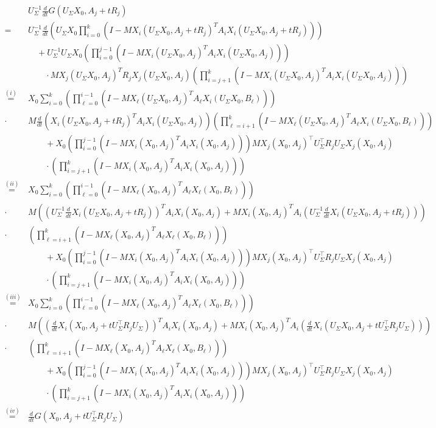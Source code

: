 \documentclass{article}
\newcommand*\lrp[1]{\left( #1 \right)}
\newcommand{\US}{U_\Sigma}
\begin{document}
\iffalse
{\allowdisplaybreaks
\begin{align*}
& \US^{-1} \frac{d}{dt} G(\US X_0, A_j + t R_j)\\
=& \US^{-1} \frac{d}{dt} \lrp{\US X_0 \prod_{i=0}^{k} \lrp{I - M X_i(\US X_0,A_j+tR_j)^T A_i X_i(\US X_0,A_j+tR_j)}}\\
&\quad + \US^{-1} \US X_0 \lrp{ \prod_{i=0}^{j-1} \lrp{I - M X_i(\US X_0,A_j)^T A_i X_i(\US X_0,A_j)}} \\
&\qquad \cdot M X_j(\US X_0,A_j)^T R_j X_j(\US X_0,A_j) \lrp{ \prod_{i=j+1}^{k} \lrp{I - M X_i(\US X_0,A_j)^T A_i X_i(\US X_0,A_j)}}\\
\overset{(i)}{=}& X_0 \sum_{i=0}^k \lrp{\prod_{\ell=0}^{i-1} \lrp{I - M X_\ell(\US X_0,A_j)^T A_\ell X_i(\US X_0,B_\ell)}}\\
\cdot& M \frac{d}{dt} \lrp{X_i(\US X_0,A_j+tR_j)^T A_i X_i(\US X_0,A_j)} \lrp{\prod_{\ell=i+1}^{k} \lrp{I - M X_\ell(\US X_0,A_j)^T A_\ell X_i(\US X_0,B_\ell)}}\\
&\qquad + X_0 \lrp{ \prod_{i=0}^{j-1} \lrp{I - M X_i(X_0,A_j)^T A_i X_i(X_0,A_j)}} M X_j(X_0,A_j)^\top \US^\top R_j \US X_j(X_0,A_j)\\
&\qquad \cdot \lrp{ \prod_{i=j+1}^{k} \lrp{I - M X_i(X_0,A_j)^T A_i X_i(X_0,A_j)}}\\
\overset{(ii)}{=}& X_0 \sum_{i=0}^k \lrp{\prod_{\ell=0}^{i-1} \lrp{I - M X_\ell(X_0,A_j)^T A_\ell X_\ell(X_0,B_\ell)}}\\
\cdot& M \lrp{\lrp{\US^{-1} \frac{d}{dt}X_i(\US X_0,A_j+tR_j)}^T A_i X_i(X_0,A_j) + M {X_i(X_0,A_j)}^T A_i \lrp{\US^{-1} \frac{d}{dt}X_i(\US X_0,A_j+tR_j)}}\\
\cdot& \lrp{\prod_{\ell=i+1}^{k} \lrp{I - M X_\ell( X_0,A_j)^T A_\ell X_\ell( X_0,B_\ell)}}\\
&\qquad + X_0 \lrp{ \prod_{i=0}^{j-1} \lrp{I - M X_i(X_0,A_j)^T A_i X_i(X_0,A_j)}} M X_j(X_0,A_j)^\top \US^\top R_j \US X_j(X_0,A_j)\\
&\qquad \cdot \lrp{ \prod_{i=j+1}^{k} \lrp{I - M X_i(X_0,A_j)^T A_i X_i(X_0,A_j)}}\\
\overset{(iii)}{=}& X_0 \sum_{i=0}^k \lrp{\prod_{\ell=0}^{i-1} \lrp{I - M X_\ell(X_0,A_j)^T A_\ell X_\ell(X_0,B_\ell)}}\\
\cdot& M \lrp{\lrp{\frac{d}{dt}X_i( X_0,A_j+t \US^{\top} R_j \US)}^T A_i X_i(X_0,A_j) + M {X_i(X_0,A_j)}^T A_i \lrp{\frac{d}{dt}X_i(\US X_0,A_j+t\US^{\top} R_j \US)}}\\
\cdot& \lrp{\prod_{\ell=i+1}^{k} \lrp{I - M X_\ell( X_0,A_j)^T A_\ell X_\ell( X_0,B_\ell)}}\\
&\qquad + X_0 \lrp{ \prod_{i=0}^{j-1} \lrp{I - M X_i(X_0,A_j)^T A_i X_i(X_0,A_j)}} M X_j(X_0,A_j)^\top \US^\top R_j \US X_j(X_0,A_j)\\
&\qquad \cdot \lrp{ \prod_{i=j+1}^{k} \lrp{I - M X_i(X_0,A_j)^T A_i X_i(X_0,A_j)}}\\
\overset{(iv)}{=}& \frac{d}{dt} G(X_0, A_j + t \US^{\top} R_j \US)
\end{align*}
}
\end{document}
